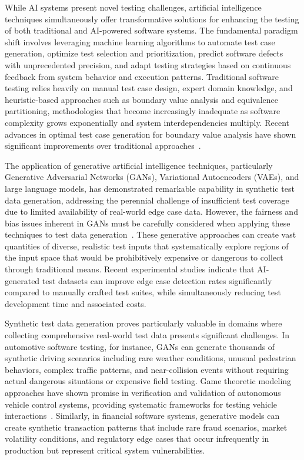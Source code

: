 \documentclass[manuscript,screen,review]{acmart}
\begin{document}
While AI systems present novel testing challenges, artificial intelligence techniques simultaneously offer transformative solutions for enhancing the testing of both traditional and AI-powered software systems. The fundamental paradigm shift involves leveraging machine learning algorithms to automate test case generation, optimize test selection and prioritization, predict software defects with unprecedented precision, and adapt testing strategies based on continuous feedback from system behavior and execution patterns. Traditional software testing relies heavily on manual test case design, expert domain knowledge, and heuristic-based approaches such as boundary value analysis and equivalence partitioning, methodologies that become increasingly inadequate as software complexity grows exponentially and system interdependencies multiply. Recent advances in optimal test case generation for boundary value analysis have shown significant improvements over traditional approaches~\cite{Guo2024}.

The application of generative artificial intelligence techniques, particularly Generative Adversarial Networks (GANs), Variational Autoencoders (VAEs), and large language models, has demonstrated remarkable capability in synthetic test data generation, addressing the perennial challenge of insufficient test coverage due to limited availability of real-world edge case data. However, the fairness and bias issues inherent in GANs must be carefully considered when applying these techniques to test data generation~\cite{Kenfack2021}. These generative approaches can create vast quantities of diverse, realistic test inputs that systematically explore regions of the input space that would be prohibitively expensive or dangerous to collect through traditional means. Recent experimental studies indicate that AI-generated test datasets can improve edge case detection rates significantly compared to manually crafted test suites, while simultaneously reducing test development time and associated costs.

Synthetic test data generation proves particularly valuable in domains where collecting comprehensive real-world test data presents significant challenges. In automotive software testing, for instance, GANs can generate thousands of synthetic driving scenarios including rare weather conditions, unusual pedestrian behaviors, complex traffic patterns, and near-collision events without requiring actual dangerous situations or expensive field testing. Game theoretic modeling approaches have shown promise in verification and validation of autonomous vehicle control systems, providing systematic frameworks for testing vehicle interactions~\cite{Li2018}. Similarly, in financial software systems, generative models can create synthetic transaction patterns that include rare fraud scenarios, market volatility conditions, and regulatory edge cases that occur infrequently in production but represent critical system vulnerabilities.
\end{document}
